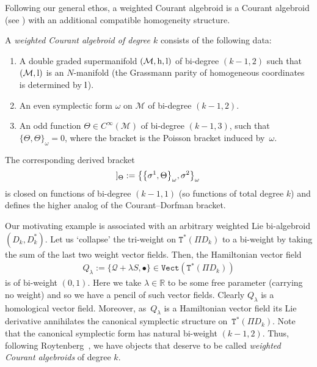 \documentclass[pdftex]{sigma}
\newcommand{\Dleft}{[\hspace{-1.5pt}[}
\newcommand{\Dright}{]\hspace{-1.5pt}]}
\newcommand{\SN}[1]{\Dleft #1 \Dright}
\newcommand{\rmh}{\textnormal{h}}
\newcommand{\rml}{\textnormal{l}}
\def\Vect{\mathtt{Vect}}
\def\sT{{\mathtt T}}
\numberwithin{equation}{section}
\begin{document}
Following our general ethos,  a weighted Courant algebroid is a Courant algebroid (see  \cite{Courant:1990,Liu:1997}) with an additional compatible homogeneity structure.
\begin{Definition}
A \emph{weighted Courant algebroid of degree $k$} consists of the following data:
 \begin{enumerate}\itemsep=0pt
\item A double graded supermanifold $({\mathcal M},\rmh,\rml)$ of bi-degree $(k-1,2)$ such that $({\mathcal M}, \rml)$ is an $N$-manifold (the Grassmann parity of homogeneous coordinates is determined by $\rml$).
\item An even  symplectic form  $\omega$ on $\mathcal{M}$  of bi-degree $(k-1,2)$.
\item An odd function $\Theta \in C^{\infty}(\mathcal{M})$ of bi-degree $(k-1,3)$, such that $\{\Theta, \Theta \}_\omega =0$, where the bracket is the Poisson bracket induced by~$\omega$.
\end{enumerate}
 The corresponding derived bracket
\begin{gather*}
\SN{\sigma^{1}, \sigma^{2}}_\Theta :=  \big\{\big\{ \sigma^1, \Theta \big\}_\omega, \sigma^{2} \big\}_\omega
\end{gather*}
is closed on functions of bi-degree $(k-1,1)$ (so functions of total degree $k$) and def\/ines the higher analog of the Courant--Dorfman bracket.
\end{Definition}


Our motivating example is associated with an arbitrary  weighted Lie bi-algebroid $(D_{k},D_{k}^{*})$. Let us `collapse' the tri-weight on $\sT^{*}(\Pi D_{k})$ to a bi-weight by taking the sum of the last two weight vector f\/ields. Then, the Hamiltonian vector f\/ield
\begin{gather*}
Q_{\lambda} :=  \{ \mathcal{Q} + \lambda   S, \bullet  \} \in \Vect(\sT^{*}(\Pi D_{k}))
\end{gather*}
 is of bi-weight $(0,1)$.  Here we take $\lambda \in \mathbb{R}$ to be some free parameter (carrying no weight) and so we have a pencil of such vector f\/ields. Clearly $Q_{\lambda}$ is a homological vector f\/ield.  Moreover, as~$Q_{\lambda}$ is a Hamiltonian vector f\/ield its Lie derivative annihilates the canonical symplectic structure on~$\sT^{*}(\Pi D_{k})$.   Note that the canonical symplectic form has natural bi-weight $(k-1,2)$. Thus, following Roytenberg~\cite{Roytenberg:2001}, we have  objects  that deserve to be called \emph{weighted Courant algebroids} of degree $k$.
\end{document}
